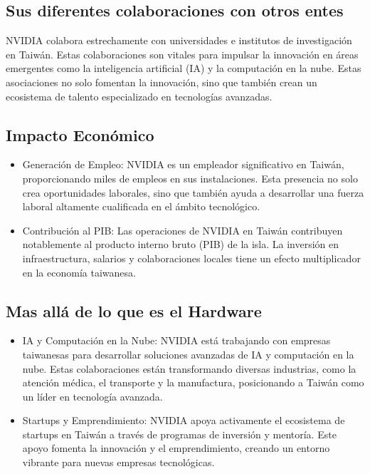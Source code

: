 \documentclass[conference]{IEEEtran}
\begin{document}
\subsection*{Sus diferentes colaboraciones con otros entes}

NVIDIA colabora estrechamente con universidades e institutos de
investigación en Taiwán. Estas colaboraciones son vitales para
impulsar la innovación en áreas emergentes como la inteligencia
artificial (IA) y la computación en la nube. Estas asociaciones no
solo fomentan la innovación, sino que también crean un ecosistema de
talento especializado en tecnologías avanzadas.

\subsection*{Impacto Económico}

\begin{itemize}
	\item Generación de Empleo:
	      NVIDIA es un empleador significativo en Taiwán,
	      proporcionando miles de empleos en sus instalaciones.
	      Esta presencia no solo crea oportunidades laborales, sino
	      que también ayuda a desarrollar una fuerza laboral altamente
	      cualificada en el ámbito tecnológico.

	\item Contribución al PIB:\@{}
	      Las operaciones de NVIDIA en Taiwán contribuyen
	      notablemente al producto interno bruto (PIB) de
	      la isla. La inversión en infraestructura, salarios y
	      colaboraciones locales tiene un efecto multiplicador en
	      la economía taiwanesa.

\end{itemize}

\subsection{Mas allá de lo que es el Hardware}

\begin{itemize}
	\item IA y Computación en la Nube:
	      NVIDIA está trabajando con empresas taiwanesas para
	      desarrollar soluciones avanzadas de IA y computación en
	      la nube. Estas colaboraciones están transformando diversas
	      industrias, como la atención médica, el transporte y la
	      manufactura, posicionando a Taiwán como un líder en
	      tecnología avanzada.

	\item Startups y Emprendimiento:
	      NVIDIA apoya activamente el ecosistema de startups en
	      Taiwán a través de programas de inversión y mentoría.
	      Este apoyo fomenta la innovación y el emprendimiento,
	      creando un entorno vibrante para nuevas empresas tecnológicas.

\end{itemize}
\end{document}
